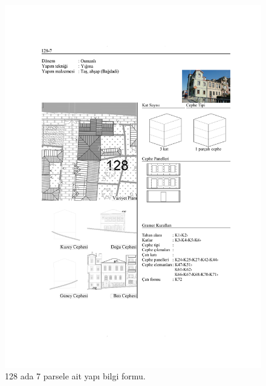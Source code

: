 \begin{figure}
\centering
\includegraphics[width=1\textwidth,height=\textheight]{source/figures/BilgiFormlari/128-7.pdf}
\caption{128 ada 7 parsele ait yapı bilgi formu.}
\end{figure}

